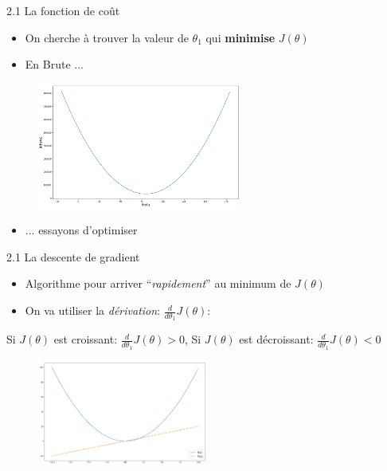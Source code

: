 \begin{frame}{2.1 La fonction de coût}
  \begin{itemize}
  \item On cherche à trouver la valeur de $\theta_{1}$ qui \textbf{minimise} $J(\theta)$
    \vspace{0.2cm}
  \item En Brute ...
  \end{itemize}
  \vspace{-0.5cm}
  \begin{figure}
    \includegraphics[width=0.6\textwidth]{fig/costFct.png}
  \end{figure}
  \vspace{-0.5cm}
  \begin{itemize}
  \item ... essayons d'optimiser
  \end{itemize}
\end{frame}

\begin{frame}{2.1 La descente de gradient}
  \begin{itemize}
  \item Algorithme pour arriver ``\textit{rapidement}'' au minimum de $J(\theta)$ 
    \vspace{0.2cm}
  \item On va utiliser la \textit{dérivation}: $\frac{d}{d\theta_{1}}J(\theta)$:
  \end{itemize}
  \begin{center}
    Si $J(\theta)$ est croissant: $\frac{d}{d\theta_{1}}J(\theta) > 0$, \hspace{0.5cm}
    Si $J(\theta)$ est décroissant: $\frac{d}{d\theta_{1}}J(\theta) < 0$
  \end{center}
  \vspace{-0.5cm}
  \begin{figure}
    \includegraphics[width=0.5\textwidth]{fig/derivation.png}
  \end{figure}
  \vspace{-0.5cm}
\end{frame}

